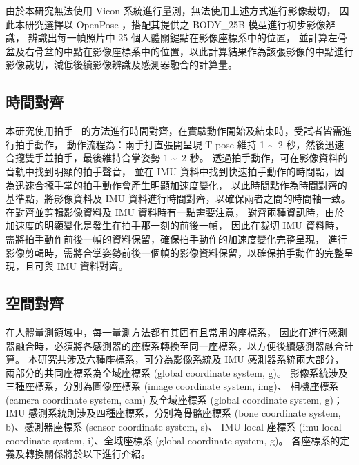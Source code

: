 由於本研究無法使用 Vicon 系統進行量測，無法使用上述方式進行影像裁切，
因此本研究選擇以 OpenPose ，搭配其提供之 BODY\_25B 模型進行初步影像辨識，
辨識出每一幀照片中 25 個人體關鍵點在影像座標系中的位置，
並計算左骨盆及右骨盆的中點在影像座標系中的位置，以此計算結果作為該張影像的中點進行影像裁切，減低後續影像辨識及感測器融合的計算量。

\subsection{時間對齊}
本研究使用拍手~\cite{pons2012data} 的方法進行時間對齊，在實驗動作開始及結束時，受試者皆需進行拍手動作，
動作流程為：兩手打直張開呈現 T pose 維持 1 \textasciitilde\ 2 秒，然後迅速合攏雙手並拍手，最後維持合掌姿勢 1 \textasciitilde\ 2 秒。
透過拍手動作，可在影像資料的音軌中找到明顯的拍手聲音，
並在 IMU 資料中找到快速拍手動作的時間點，因為迅速合攏手掌的拍手動作會產生明顯加速度變化，
以此時間點作為時間對齊的基準點，將影像資料及 IMU 資料進行時間對齊，以確保兩者之間的時間軸一致。
在對齊並剪輯影像資料及 IMU 資料時有一點需要注意，
對齊兩種資訊時，由於加速度的明顯變化是發生在拍手那一刻的前後一幀，
因此在裁切 IMU 資料時，需將拍手動作前後一幀的資料保留，確保拍手動作的加速度變化完整呈現，
進行影像剪輯時，需將合掌姿勢前後一個幀的影像資料保留，以確保拍手動作的完整呈現，且可與 IMU 資料對齊。

\subsection{空間對齊}
在人體量測領域中，每一量測方法都有其固有且常用的座標系，
因此在進行感測器融合時，必須將各感測器的座標系轉換至同一座標系，以方便後續感測器融合計算。
本研究共涉及六種座標系，可分為影像系統及 IMU 感測器系統兩大部分，兩部分的共同座標系為全域座標系 (global coordinate system, g)。
影像系統涉及三種座標系，分別為圖像座標系 (image coordinate system, img)、
相機座標系 (camera coordinate system, cam) 及全域座標系 (global coordinate system, g)；
IMU 感測系統則涉及四種座標系，分別為骨骼座標系 (bone coordinate system, b)、感測器座標系 (sensor coordinate system, s)、
IMU local 座標系 (imu local coordinate system, i)、全域座標系 (global coordinate system, g)。
各座標系的定義及轉換關係將於以下進行介紹。

